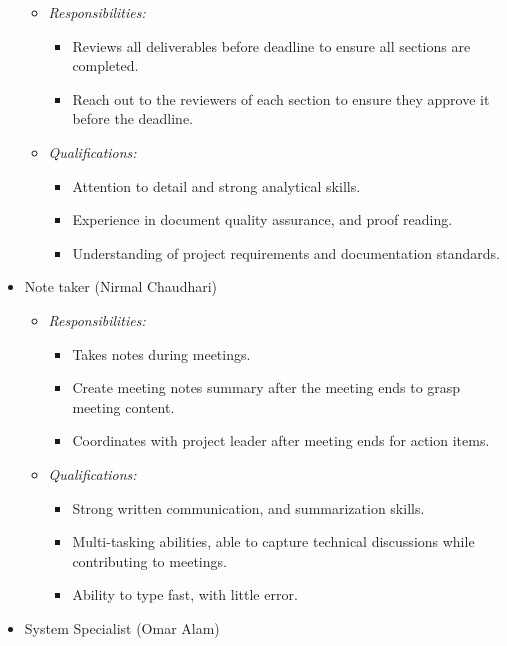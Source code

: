 \documentclass[12pt]{article}
\theoremstyle{definition}
\begin{document}
\begin{itemize}
\begin{itemize}
      \item \textit{Responsibilities:}
        \begin{itemize}
          \item Reviews all deliverables before deadline to ensure all sections
           are completed.
          \item Reach out to the reviewers of each section to ensure they
          approve it before the deadline.
        \end{itemize}
      \item \textit{Qualifications:}
        \begin{itemize}
          \item Attention to detail and strong analytical skills.
          \item Experience in document quality assurance, and proof reading. 
          \item Understanding of project requirements and documentation
          standards. 
        \end{itemize}
    \end{itemize}
  \item Note taker (Nirmal Chaudhari)
    \begin{itemize}
      \item \textit{Responsibilities:}
        \begin{itemize}
          \item Takes notes during meetings.
          \item Create meeting notes summary after the meeting ends to grasp
          meeting content.
          \item Coordinates with project leader after meeting ends for action
          items. 
        \end{itemize}
      \item \textit{Qualifications:}
        \begin{itemize}
          \item Strong written communication, and summarization skills. 
          \item Multi-tasking abilities, able to capture technical discussions
          while contributing to meetings. 
          \item Ability to type fast, with little error. 
        \end{itemize}
    \end{itemize}
  \item System Specialist (Omar Alam)
    \begin{itemize}

\end{itemize}
\end{itemize}
\end{document}
